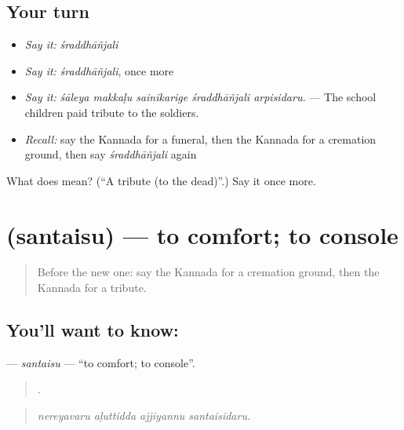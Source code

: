 \subsection*{Your turn}
\begin{itemize}
\raggedright
  \item \emph{Say it:} \emph{śraddhāñjali}
  \item \emph{Say it:} \emph{śraddhāñjali}, once more
  \item \emph{Say it:} \emph{śāleya makkaḷu sainikarige śraddhāñjali arpisidaru.} — The school children paid tribute to the soldiers.
  \item \emph{Recall:} say the Kannada for a funeral, then the Kannada for a cremation ground, then say \emph{śraddhāñjali} again
\end{itemize}

\begin{tcolorbox}[breakable,colback=teal!4,colframe=teal!35!black,title={Before you move on}]
What does  mean? (\textquotedblleft{}A tribute (to the dead)\textquotedblright{}.) Say it once more.
\end{tcolorbox}
\section[\texorpdfstring{\kn{ಸಂತೈಸು} (santaisu)}{ಸಂತೈಸು (santaisu)}]{ (santaisu) — to comfort; to console}

\label{lesson:KA-C337-santaisu}



\begin{quote}
Before the new one: say the Kannada for a cremation ground, then the Kannada for a tribute.
\end{quote}

\subsection*{You'll want to know: }
\textbf{} — \emph{santaisu} — \textquotedblleft{}to comfort; to console\textquotedblright{}.

\begin{quote}
   .
\end{quote}

\begin{quote}
\emph{nereyavaru aḷuttidda ajjiyannu santaisidaru.}
\end{quote}

